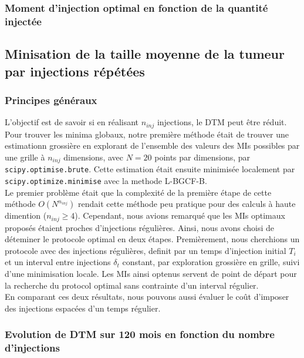 \documentclass[12pt,a4paper]{article}
\begin{document}
\subsubsection{Moment d'injection optimal en fonction de la quantité injectée}

\subsection[Injections répétées]{Minisation de la taille moyenne de la tumeur par injections répétées}
\subsubsection{Principes généraux}
L'objectif est de savoir si en réalisant $n_{inj}$ injections, le \ac{DTM} peut être réduit. 
Pour trouver les minima globaux, notre première méthode était de trouver une estimationn grossière en explorant de l'ensemble des valeurs des \acp{MI} possibles par une grille à $n_{inj}$ dimensions, avec $N=20$ points par dimensions, par \texttt{scipy.optimise.brute}. Cette estimation était ensuite  minimisée localement par \texttt{scipy.optimize.minimise} avec la methode L-BGCF-B\cite{}.\\
Le premier problème était que la complexité de la première étape de cette méthode $O({N}^{n_{inj}})$ rendait cette méthode peu pratique pour des calculs à haute dimention ($n_{inj}\geq4$). Cependant, nous avions remarqué que les \acp{MI} optimaux proposés étaient proches d'injections régulières. Ainsi, nous avons choisi de déteminer le protocole optimal en deux étapes. Premièrement, nous cherchions un protocole avec des injections régulières, definit par un temps d'injection initial $T_{i}$ et un interval entre injections $\delta_{t}$ constant, par exploration grossière en grille, suivi d'une minimisation locale. Les \acp{MI} ainsi optenus servent de point de départ pour la recherche du protocol optimal sans contrainte d'un interval régulier.\\
En comparant ces deux résultats, nous pouvons aussi évaluer le coût d'imposer des injections espacées d'un temps régulier.

\subsubsection[Injections multiples 120 mois]{Evolution de \acf{DTM} sur 120 mois en fonction du nombre d'injections}
\subsubsection{}
\end{document}

